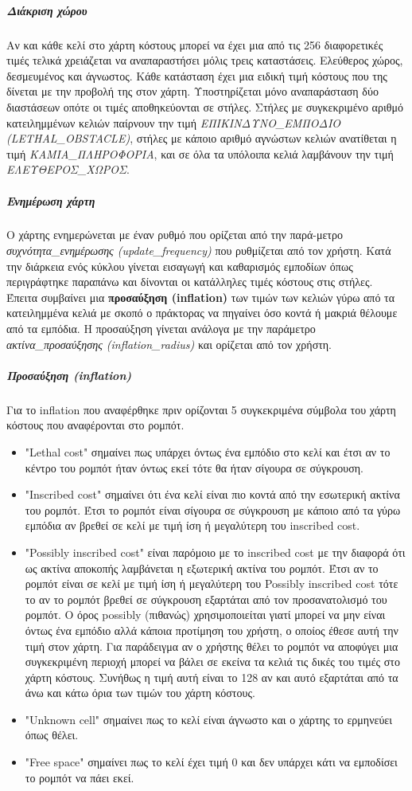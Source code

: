 \subparagraph{Διάκριση χώρου} Αν και κάθε κελί στο χάρτη κόστους μπορεί να έχει μια από τις 256 διαφορετικές τιμές τελικά χρειάζεται να αναπαραστήσει μόλις τρεις καταστάσεις. Ελεύθερος χώρος, δεσμευμένος και άγνωστος. Κάθε κατάσταση έχει μια ειδική τιμή κόστους που της δίνεται με την προβολή της στον χάρτη. Υποστηρίζεται μόνο αναπαράσταση δύο διαστάσεων οπότε οι τιμές αποθηκεύονται σε στήλες. Στήλες με συγκεκριμένο αριθμό κατειλημμένων κελιών παίρνουν την τιμή \textit{ΕΠΙΚΙΝΔΥΝΟ\_ΕΜΠΟΔΙΟ (LETHAL\_OBSTACLE)}, στήλες με κάποιο αριθμό αγνώστων κελιών ανατίθεται η τιμή \textit{ΚΑΜΙΑ\_ΠΛΗΡΟΦΟΡΙΑ}, και σε όλα τα υπόλοιπα κελιά λαμβάνουν την τιμή \textit{ΕΛΕΥΘΕΡΟΣ\_ΧΩΡΟΣ}.

\subparagraph{Ενημέρωση χάρτη} Ο χάρτης ενημερώνεται με έναν ρυθμό που ορίζεται από την παρά-μετρο \textit{συχνότητα\_ενημέρωσης (update\_frequency)} που ρυθμίζεται από τον χρήστη. Κατά την διάρκεια ενός κύκλου γίνεται εισαγωγή και καθαρισμός εμποδίων όπως περιγράφτηκε παραπάνω και δίνονται οι κατάλληλες τιμές κόστους στις στήλες. Έπειτα συμβαίνει μια \textbf{προσαύξηση (inflation)} των τιμών των κελιών γύρω από τα κατειλημμένα κελιά με σκοπό ο πράκτορας να πηγαίνει όσο κοντά ή μακριά θέλουμε από τα εμπόδια. Η προσαύξηση γίνεται ανάλογα με την παράμετρο \textit{ακτίνα\_προσαύξησης (inflation\_radius)} και ορίζεται από τον χρήστη. 	

\subparagraph{Προσαύξηση (inflation)} Για το inflation που αναφέρθηκε πριν ορίζονται 5 συγκεκριμένα σύμβολα του χάρτη κόστους που αναφέρονται στο ρομπότ.  

\begin{itemize}
	\item "Lethal cost" σημαίνει πως υπάρχει όντως ένα εμπόδιο στο κελί και έτσι αν το κέντρο του ρομπότ ήταν όντως εκεί τότε θα ήταν σίγουρα σε σύγκρουση. 
	\item "Inscribed cost" σημαίνει ότι ένα κελί είναι πιο κοντά από την εσωτερική ακτίνα του ρομπότ. Έτσι το ρομπότ είναι σίγουρα σε σύγκρουση με κάποιο από τα γύρω εμπόδια αν βρεθεί σε κελί με τιμή ίση ή μεγαλύτερη του inscribed cost.
	\item "Possibly inscribed cost" είναι παρόμοιο με το inscribed cost με την διαφορά ότι ως ακτίνα αποκοπής λαμβάνεται η εξωτερική ακτίνα του ρομπότ. Έτσι αν το ρομπότ είναι σε κελί με τιμή ίση ή μεγαλύτερη του Possibly inscribed cost τότε το αν το ρομπότ βρεθεί σε σύγκρουση εξαρτάται από τον προσανατολισμό του ρομπότ. Ο όρος possibly (πιθανώς) χρησιμοποιείται γιατί μπορεί να μην είναι όντως ένα εμπόδιο αλλά κάποια προτίμηση του χρήστη, ο οποίος έθεσε αυτή την τιμή στον χάρτη. Για παράδειγμα αν ο χρήστης θέλει το ρομπότ να αποφύγει μια συγκεκριμένη περιοχή μπορεί να βάλει σε εκείνα τα κελιά τις δικές του τιμές στο χάρτη κόστους. Συνήθως η τιμή αυτή είναι το 128 αν και αυτό εξαρτάται από τα άνω και κάτω όρια των τιμών του χάρτη κόστους.
	\item "Unknown cell" σημαίνει πως το κελί είναι άγνωστο και ο χάρτης το ερμηνεύει όπως θέλει. 	
	\item "Free space" σημαίνει πως το κελί έχει τιμή 0 και δεν υπάρχει κάτι να εμποδίσει το ρομπότ να πάει εκεί.
\end{itemize} 

